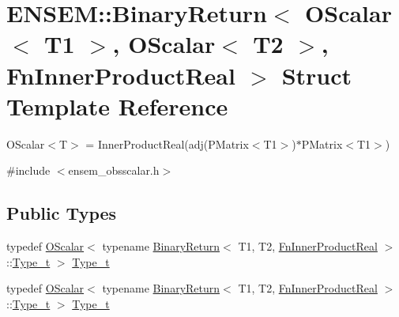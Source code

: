 \hypertarget{structENSEM_1_1BinaryReturn_3_01OScalar_3_01T1_01_4_00_01OScalar_3_01T2_01_4_00_01FnInnerProductReal_01_4}{}\section{E\+N\+S\+EM\+:\+:Binary\+Return$<$ O\+Scalar$<$ T1 $>$, O\+Scalar$<$ T2 $>$, Fn\+Inner\+Product\+Real $>$ Struct Template Reference}
\label{structENSEM_1_1BinaryReturn_3_01OScalar_3_01T1_01_4_00_01OScalar_3_01T2_01_4_00_01FnInnerProductReal_01_4}


O\+Scalar$<$\+T$>$ = Inner\+Product\+Real(adj(\+P\+Matrix$<$\+T1$>$)$\ast$\+P\+Matrix$<$\+T1$>$)  




{\ttfamily \#include $<$ensem\+\_\+obsscalar.\+h$>$}

\subsection*{Public Types}
\begin{DoxyCompactItemize}
\item 
typedef \mbox{\hyperlink{classENSEM_1_1OScalar}{O\+Scalar}}$<$ typename \mbox{\hyperlink{structENSEM_1_1BinaryReturn}{Binary\+Return}}$<$ T1, T2, \mbox{\hyperlink{structENSEM_1_1FnInnerProductReal}{Fn\+Inner\+Product\+Real}} $>$\+::\mbox{\hyperlink{structENSEM_1_1BinaryReturn_3_01OScalar_3_01T1_01_4_00_01OScalar_3_01T2_01_4_00_01FnInnerProductReal_01_4_a7660dd8ee24814192b25ecbb29c86a33}{Type\+\_\+t}} $>$ \mbox{\hyperlink{structENSEM_1_1BinaryReturn_3_01OScalar_3_01T1_01_4_00_01OScalar_3_01T2_01_4_00_01FnInnerProductReal_01_4_a7660dd8ee24814192b25ecbb29c86a33}{Type\+\_\+t}}
\item 
typedef \mbox{\hyperlink{classENSEM_1_1OScalar}{O\+Scalar}}$<$ typename \mbox{\hyperlink{structENSEM_1_1BinaryReturn}{Binary\+Return}}$<$ T1, T2, \mbox{\hyperlink{structENSEM_1_1FnInnerProductReal}{Fn\+Inner\+Product\+Real}} $>$\+::\mbox{\hyperlink{structENSEM_1_1BinaryReturn_3_01OScalar_3_01T1_01_4_00_01OScalar_3_01T2_01_4_00_01FnInnerProductReal_01_4_a7660dd8ee24814192b25ecbb29c86a33}{Type\+\_\+t}} $>$ \mbox{\hyperlink{structENSEM_1_1BinaryReturn_3_01OScalar_3_01T1_01_4_00_01OScalar_3_01T2_01_4_00_01FnInnerProductReal_01_4_a7660dd8ee24814192b25ecbb29c86a33}{Type\+\_\+t}}
\end{DoxyCompactItemize}


